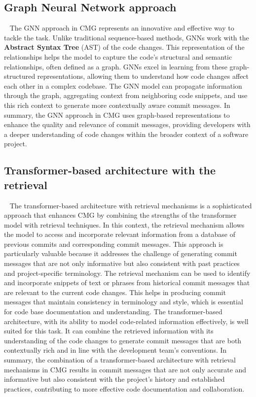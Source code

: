 \subsection{Graph Neural Network approach}~\label{sec:GNN_for_CMG}
The GNN approach in CMG represents an innovative and effective way to tackle the task. Unlike traditional sequence-based methods, GNNs work with the \textbf{Abstract Syntax Tree} (AST) of the code changes. This representation of the relationships helps the model to capture the code's structural and semantic relationships, often defined as a graph.
GNNs excel in learning from these graph-structured representations, allowing them to understand how code changes affect each other in a complex codebase. The GNN model can propagate information through the graph, aggregating context from neighboring code snippets, and use this rich context to generate more contextually aware commit messages.
In summary, the GNN approach in CMG uses graph-based representations to enhance the quality and relevance of commit messages, providing developers with a deeper understanding of code changes within the broader context of a software project.

\subsection{Transformer-based architecture with the retrieval}~\label{sec:retrieval_for_cmg}
The transformer-based architecture with retrieval mechanisms is a sophisticated approach that enhances CMG by combining the strengths of the transformer model with retrieval techniques. In this context, the retrieval mechanism allows the model to access and incorporate relevant information from a database of previous commits and corresponding commit messages.
This approach is particularly valuable because it addresses the challenge of generating commit messages that are not only informative but also consistent with past practices and project-specific terminology. The retrieval mechanism can be used to identify and incorporate snippets of text or phrases from historical commit messages that are relevant to the current code changes. This helps in producing commit messages that maintain consistency in terminology and style, which is essential for code base documentation and understanding.
The transformer-based architecture, with its ability to model code-related information effectively, is well suited for this task. It can combine the retrieved information with its understanding of the code changes to generate commit messages that are both contextually rich and in line with the development team's conventions.
In summary, the combination of a transformer-based architecture with retrieval mechanisms in CMG results in commit messages that are not only accurate and informative but also consistent with the project's history and established practices, contributing to more effective code documentation and collaboration.

